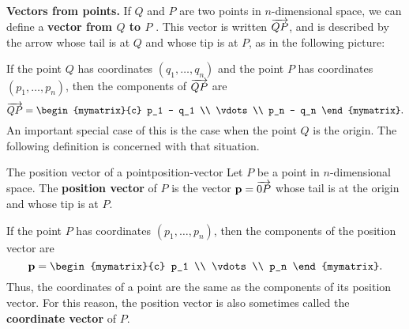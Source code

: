 \noindent\textbf{Vectors from points.}
If $Q$ and $P$ are two points in $n$-dimensional space, we can define
a \textbf{vector from $Q$ to $P$}%
. This vector is written
$\overrightarrow{QP}$, and is described by the arrow whose tail is at $Q$
and whose tip is at $P$, as in the following picture:
\begin{center}
\end{center}
If the point $Q$ has coordinates $(q_1,\ldots,q_n)$ and the point $P$
has coordinates $(p_1,\ldots,p_n)$, then the components of
$\overrightarrow{QP}$ are
\begin{equation*}
  \longvect{QP} =
  \begin{mymatrix}{c}
    p_1 - q_1 \\
    \vdots    \\
    p_n - q_n
  \end{mymatrix}.
\end{equation*}
An important special case of this is the case when the point $Q$ is
the origin. The following definition is concerned with that situation.

\begin{definition}{The position vector of a point}{position-vector}
  Let $P$ be a point in $n$-dimensional space. The \textbf{position
    vector}%
   of $P$ is the vector
  $\vect{p} = \longvect{0P}$ whose tail is at the origin and whose tip
  is at $P$.
  \begin{center}
  \end{center}
  If the point $P$ has coordinates $(p_1,\ldots,p_n)$, then the
  components of the position vector are
  \begin{equation*}
    \vect{p} =
    \begin{mymatrix}{c}
      p_1    \\
      \vdots \\
      p_n
    \end{mymatrix}.
  \end{equation*}
  Thus, the coordinates of a point are the same as the components of
  its position vector. For this reason, the position vector is also
  sometimes called the \textbf{coordinate vector}%
   of $P$.
\end{definition}

